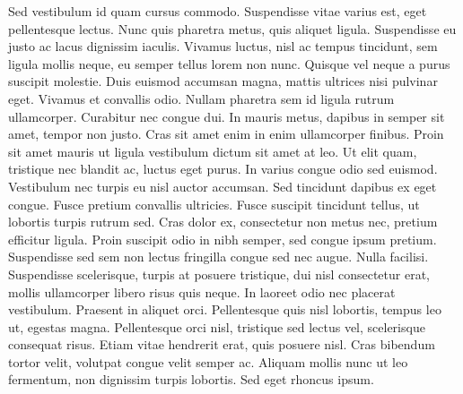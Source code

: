 Sed vestibulum id quam cursus commodo. Suspendisse vitae varius est, eget pellentesque lectus. Nunc quis pharetra metus, quis aliquet ligula. Suspendisse eu justo ac lacus dignissim iaculis. Vivamus luctus, nisl ac tempus tincidunt, sem ligula mollis neque, eu semper tellus lorem non nunc. Quisque vel neque a purus suscipit molestie. Duis euismod accumsan magna, mattis ultrices nisi pulvinar eget. Vivamus et convallis odio. Nullam pharetra sem id ligula rutrum ullamcorper. Curabitur nec congue dui. In mauris metus, dapibus in semper sit amet, tempor non justo. Cras sit amet enim in enim ullamcorper finibus. Proin sit amet mauris ut ligula vestibulum dictum sit amet at leo. Ut elit quam, tristique nec blandit ac, luctus eget purus. In varius congue odio sed euismod. Vestibulum nec turpis eu nisl auctor accumsan.
Sed tincidunt dapibus ex eget congue. Fusce pretium convallis ultricies. Fusce suscipit tincidunt tellus, ut lobortis turpis rutrum sed. Cras dolor ex, consectetur non metus nec, pretium efficitur ligula. Proin suscipit odio in nibh semper, sed congue ipsum pretium. Suspendisse sed sem non lectus fringilla congue sed nec augue. Nulla facilisi. Suspendisse scelerisque, turpis at posuere tristique, dui nisl consectetur erat, mollis ullamcorper libero risus quis neque. In laoreet odio nec placerat vestibulum. Praesent in aliquet orci. Pellentesque quis nisl lobortis, tempus leo ut, egestas magna. Pellentesque orci nisl, tristique sed lectus vel, scelerisque consequat risus. Etiam vitae hendrerit erat, quis posuere nisl. Cras bibendum tortor velit, volutpat congue velit semper ac. Aliquam mollis nunc ut leo fermentum, non dignissim turpis lobortis. Sed eget rhoncus ipsum.